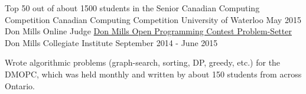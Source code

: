 \begin{cventries}
	\cventry
	{Top 50 out of about 1500 students in the Senior Canadian Computing Competition}
	{Canadian Computing Competition}
	{University of Waterloo}
	{May 2015}
	{}
	\cventry
    {Don Mills Online Judge}
    {\href{https://dmoj.ca/user/Sentient/solved}{Don Mills Open Programming Contest Problem-Setter}}
    {Don Mills Collegiate Institute}
    {September 2014 - June 2015}
    {
      \begin{cvitems}
        \item {Wrote algorithmic problems (graph-search, sorting, DP, greedy, etc.) for the DMOPC, which was held monthly and written by about 150 students from across Ontario.}
      \end{cvitems}
    }
\end{cventries}
